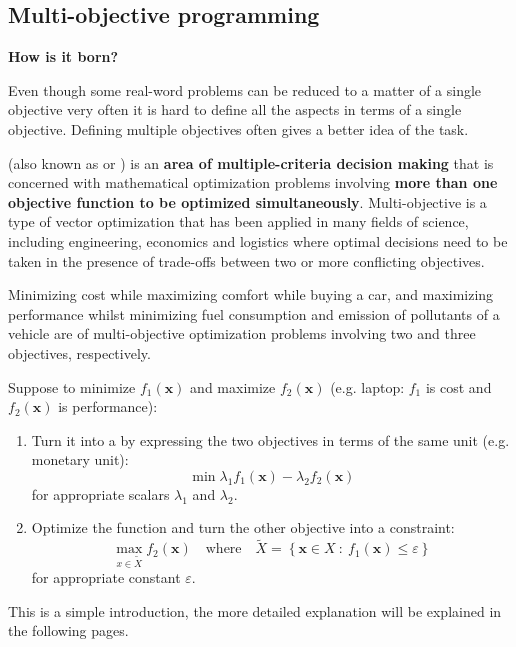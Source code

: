 \subsection{Multi-objective programming}\label{subsection: Multi-objective programming}

\begin{flushleft}
    \textcolor{Green3}{ \textbf{How is it born?}}
\end{flushleft}
Even though some real-word problems can be reduced to a matter of a single objective very often it is hard to define all the aspects in terms of a single objective. Defining multiple objectives often gives a better idea of the task.

\highspace
{} (also known as  or ) is an \textbf{area of multiple-criteria decision making} that is concerned with mathematical optimization problems involving \textbf{more than one objective function to be optimized simultaneously}. Multi-objective is a type of vector optimization that has been applied in many fields of science, including engineering, economics and logistics where optimal decisions need to be taken in the presence of trade-offs between two or more conflicting objectives. 

Minimizing cost while maximizing comfort while buying a car, and maximizing performance whilst minimizing fuel consumption and emission of pollutants of a vehicle are  of multi-objective optimization problems involving two and three objectives, respectively.\cite{abraham2005evolutionary}

\highspace
Suppose to minimize $f_{1}\left(\mathbf{x}\right)$ and maximize $f_{2}\left(\mathbf{x}\right)$ (e.g. laptop: $f_{1}$ is cost and $f_{2}\left(\mathbf{x}\right)$ is performance):
\begin{enumerate}
    \item Turn it into a  by expressing the two objectives in terms of the same unit (e.g. monetary unit):
    \begin{equation*}
        \min \lambda_{1}f_{1}\left(\mathbf{x}\right) - \lambda_{2}f_{2}\left(\mathbf{x}\right)
    \end{equation*}
    for appropriate scalars $\lambda_{1}$ and $\lambda_{2}$.

    \item Optimize the  function and turn the other objective into a constraint:
    \begin{equation*}
        \underset{x \in \tilde{X}}{\max} f_{2}\left(\mathbf{x}\right) \hspace{1em} \text{where} \hspace{1em} \tilde{X} = \left\{\mathbf{x} \in X \: : \: f_{1}\left(\mathbf{x}\right) \le \varepsilon \right\}
    \end{equation*}
    for appropriate constant $\varepsilon$.
\end{enumerate}
This is a simple introduction, the more detailed explanation will be explained in the following pages.